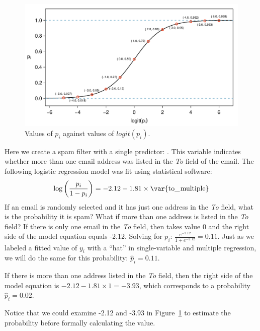 \begin{figure}
\centering
\includegraphics[width=\textwidth]{ch_regr_mult_and_log/figures/logitTransformationFigureHoriz/logitTransformationFigureHoriz}
\caption{Values of $p_i$ against values of $logit(p_i)$.}
\label{logitTransformationFigureHoriz}
\end{figure}

\begin{example}{Here we create a spam filter with a single predictor: . This variable indicates whether more than one email address was listed in the \emph{To} field of the email. The following logistic regression model was fit using statistical software:
\begin{align*}
\log\left( \frac{p_i}{1-p_i} \right) = -2.12 - 1.81\times\text{\var{to\_\hspace{0.3mm}multiple}}
\end{align*}
If an email is randomly selected and it has just one address in the \emph{To} field, what is the probability it is spam? What if more than one address is listed in the \emph{To} field?}\label{logisticExampleWithToMultiple}
If there is only one email in the \emph{To} field, then  takes value 0 and the right side of the model equation equals -2.12. Solving for $p_i$: $\frac{e^{-2.12}}{1 + e^{-2.12}} = 0.11$. Just as we labeled a fitted value of $y_i$ with a ``hat'' in single-variable and multiple regression, we will do the same for this probability: $\hat{p}_i = 0.11$.

If there is more than one address listed in the \emph{To} field, then the right side of the model equation is $-2.12 - 1.81\times1 = -3.93$, which corresponds to a probability $\hat{p}_i = 0.02$.

Notice that we could examine -2.12 and -3.93 in Figure~\ref{logitTransformationFigureHoriz} to estimate the probability before formally calculating the value.
\end{example}

